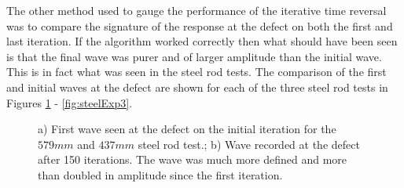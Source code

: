  
 The other method used to gauge the performance of the iterative time reversal was to compare the signature of the response at the defect on both the first and last iteration. If the algorithm worked correctly then what should have been seen is that the final wave was purer and of larger amplitude than the initial wave. This is in fact what was seen in the steel rod tests. The comparison of the first and initial waves at the defect are shown for each of the three steel rod tests in Figures \ref{fig:steelExp1} - \ref{fig:steelExp3}.
 
  \begin{figure}
 \begin{subfigmatrix}{2}
 \end{subfigmatrix}
 
    \caption
    { \label{fig:steelExp1}
    a) First wave seen at the defect on the initial iteration for the $579 mm$ and $437 mm$ steel rod test.; b) Wave recorded at the defect after 150 iterations. The wave was much more defined and more than doubled in amplitude since the first iteration.
  }
 \end{figure}
 
